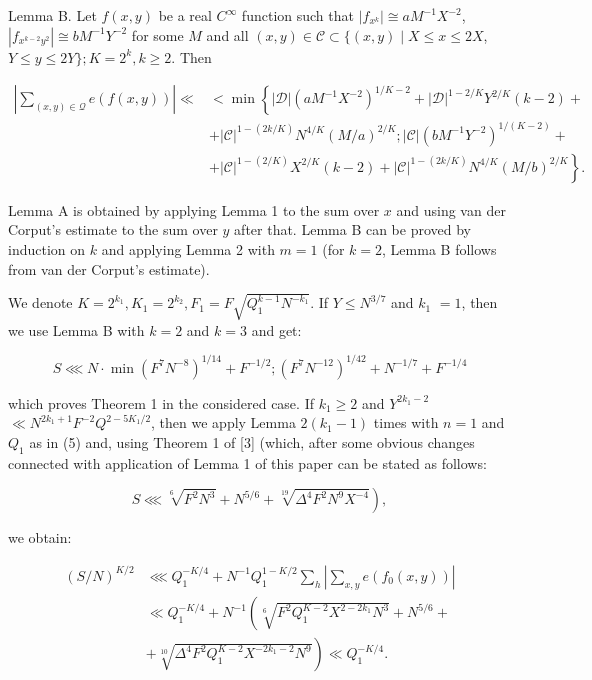 \documentclass[10pt]{article}
\begin{document}
Lemma B. Let $f(x, y)$ be a real $C^{\infty}$ function such that $\left|f_{x^{k}}\right| \cong a M^{-1} X^{-2}$, $\left|f_{x^{k-2} y^{2}}\right| \cong b M^{-1} Y^{-2}$ for some $M$ and all $(x, y) \in \mathscr{C} \subset\{(x, y) \mid X \leqslant x \leqslant 2 X$, $Y \leqslant y \leqslant 2 Y\} ; K=2^{k}, k \geqslant 2$. Then

$$
\begin{aligned}
\left|\sum_{(x, y) \in \mathscr{Q}} e(f(x, y))\right| \ll & <\min \left\{|\mathscr{D}|\left(a M^{-1} X^{-2}\right)^{1 / K-2}+|\mathscr{D}|^{1-2 / K} Y^{2 / K}(k-2)+\right. \\
& +|\mathscr{C}|^{1-(2 k / K)} N^{4 / K}(M / a)^{2 / K} ;|\mathscr{C}|\left(b M^{-1} Y^{-2}\right)^{1 /(K-2)}+ \\
& \left.+|\mathscr{C}|^{1-(2 / K)} X^{2 / K}(k-2)+|\mathscr{C}|^{1-(2 k / K)} N^{4 / K}(M / b)^{2 / K}\right\} .
\end{aligned}
$$

Lemma A is obtained by applying Lemma 1 to the sum over $x$ and using van der Corput's estimate to the sum over $y$ after that. Lemma B can be proved by induction on $k$ and applying Lemma 2 with $m=1$ (for $k=2$, Lemma B follows from van der Corput's estimate).

We denote $K=2^{k_{1}}, K_{1}=2^{k_{2}}, F_{1}=F \sqrt{Q_{1}^{k-1} N^{-k_{1}}}$. If $Y \leqslant N^{3 / 7}$ and $k_{1}$ $=1$, then we use Lemma B with $k=2$ and $k=3$ and get:

$$
S \lll N \cdot \min \left(F^{7} N^{-8}\right)^{1 / 14}+F^{-1 / 2} ;\left(F^{7} N^{-12}\right)^{1 / 42}+N^{-1 / 7}+F^{-1 / 4}
$$

which proves Theorem 1 in the considered case. If $k_{1} \geqslant 2$ and $Y^{2 k_{1}-2}$\\
$\ll N^{2 k_{1}+1} F^{-2} Q^{2-5 K_{1} / 2}$, then we apply Lemma $2\left(k_{1}-1\right)$ times with $n=1$ and $Q_{1}$ as in (5) and, using Theorem 1 of [3] (which, after some obvious changes connected with application of Lemma 1 of this paper can be stated as follows:

$$
\left.S \lll \sqrt[6]{F^{2} N^{3}}+N^{5 / 6}+\sqrt[19]{\Delta^{4} F^{2} N^{9} X^{-4}}\right),
$$

we obtain:

$$
\begin{aligned}
(S / N)^{K / 2} & \lll Q_{1}^{-K / 4}+N^{-1} Q_{1}^{1-K / 2} \sum_{h}\left|\sum_{x, y} e\left(f_{0}(x, y)\right)\right| \\
& \ll Q_{1}^{-K / 4}+N^{-1}\left(\sqrt[6]{F^{2} Q_{1}^{K-2} X^{2-2 k_{1}} N^{3}}+N^{5 / 6}+\right. \\
& \left.+\sqrt[10]{\Delta^{4} F^{2} Q_{1}^{K-2} X^{-2 k_{1}-2} N^{9}}\right) \ll Q_{1}^{-K / 4} .
\end{aligned}
$$
\end{document}

